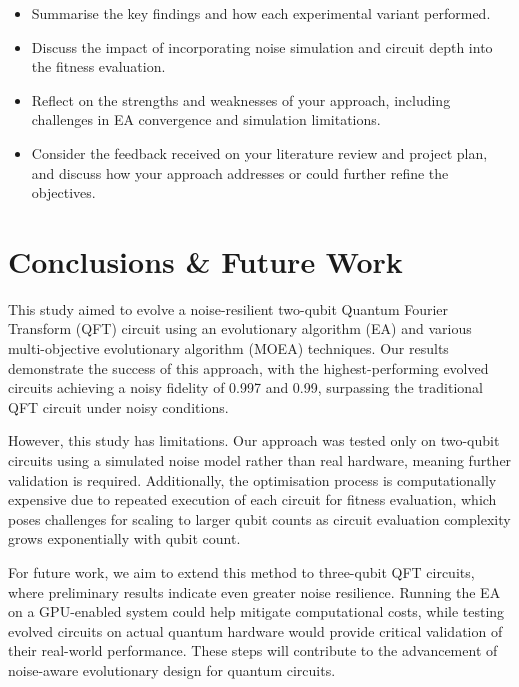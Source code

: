 \documentclass[11pt,a4paper]{article}
\begin{document}
\begin{itemize}
  \item Summarise the key findings and how each experimental variant performed.
  \item Discuss the impact of incorporating noise simulation and circuit depth into the fitness evaluation.
  \item Reflect on the strengths and weaknesses of your approach, including challenges in EA convergence and simulation limitations.
  \item Consider the feedback received on your literature review and project plan, and discuss how your approach addresses or could further refine the objectives.
\end{itemize}

%
%
\section{Conclusions \& Future Work}
This study aimed to evolve a noise-resilient two-qubit Quantum Fourier Transform (QFT) circuit using an evolutionary algorithm (EA) and various multi-objective evolutionary algorithm (MOEA) techniques. Our results demonstrate the success of this approach, with the highest-performing evolved circuits achieving a noisy fidelity of 0.997 and 0.99, surpassing the traditional QFT circuit under noisy conditions.\newline

However, this study has limitations. Our approach was tested only on two-qubit circuits using a simulated noise model rather than real hardware, meaning further validation is required. Additionally, the optimisation process is computationally expensive due to repeated execution of each circuit for fitness evaluation, which poses challenges for scaling to larger qubit counts as circuit evaluation complexity grows exponentially with qubit count.\newline

For future work, we aim to extend this method to three-qubit QFT circuits, where preliminary results indicate even greater noise resilience. Running the EA on a GPU-enabled system could help mitigate computational costs, while testing evolved circuits on actual quantum hardware would provide critical validation of their real-world performance. These steps will contribute to the advancement of noise-aware evolutionary design for quantum circuits.
\end{document}
